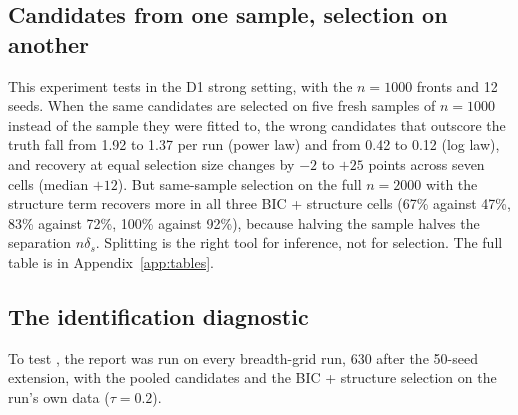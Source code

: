 \begin{table}[ht]
\centering\small
\caption{Inference after selection: coverage of nominal 95\% intervals and rejection rates of 5\% tests, 4{,}500 two-step GMM fits on the breadth-grid runs.}
\label{tab:inference}
\end{table}

\subsection{Candidates from one sample, selection on another}
\label{sec:mc-split}

This experiment tests  in the D1 strong setting, with the $n = 1000$ fronts and 12 seeds. When the same candidates are selected on five fresh samples of $n = 1000$ instead of the sample they were fitted to, the wrong candidates that outscore the truth fall from 1.92 to 1.37 per run (power law) and from 0.42 to 0.12 (log law), and recovery at equal selection size changes by $-2$ to $+25$ points across seven cells (median $+12$). But same-sample selection on the full $n = 2000$ with the structure term recovers more in all three BIC + structure cells (67\% against 47\%, 83\% against 72\%, 100\% against 92\%), because halving the sample halves the separation $n\delta_s$. Splitting is the right tool for inference, not for selection. The full table is in Appendix~\ref{app:tables}.

\subsection{The identification diagnostic}
\label{sec:mc-ident}

To test , the report was run on every breadth-grid run, 630 after the 50-seed extension, with the pooled candidates and the BIC + structure selection on the run's own data ($\tau = 0.2$).

